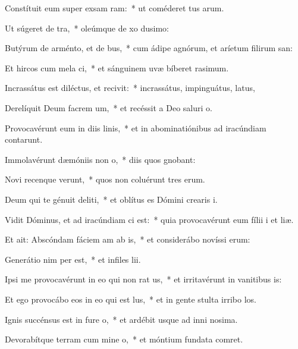 \item Constítuit eum super exsam ram:~* ut coméderet tus arum.
\item Ut súgeret  de tra,~* oleúmque de xo dusimo:
\item Butýrum de arménto, et  de bus,~* cum ádipe agnórum, et aríetum filirum san:
\item Et hircos cum mela ci,~* et sánguinem uvæ bíberet rasimum.
\item Incrassátus est diléctus, et recivit:~* incrassátus, impinguátus, latus,
\item Derelíquit Deum facrem um,~* et recéssit a Deo saluri o.
\item Provocavérunt eum in diis linis,~* et in abominatiónibus ad iracúndiam contarunt.
\item Immolavérunt dæmóniis  non o,~* diis quos gnobant:
\item Novi recenque verunt,~* quos non coluérunt tres erum.
\item Deum qui te génuit deliti,~* et oblítus es Dómini crearis i.
\item \singlecolsep
\item Vidit Dóminus, et ad iracúndiam ci est:~* quia provocavérunt eum fílii i et liæ.
\item Et ait: Abscóndam fáciem am ab is,~* et considerábo novíssi erum:
\item Generátio nim per est,~* et infiles lii.
\item Ipsi me provocavérunt in eo qui non rat us,~* et irritavérunt in vanitibus is:
\item Et ego provocábo eos in eo qui  est lus,~* et in gente stulta irribo los.
\item Ignis succénsus est in fure o,~* et ardébit usque ad inni nosima.
\item Devorabítque terram cum mine o,~* et móntium fundata comret.
